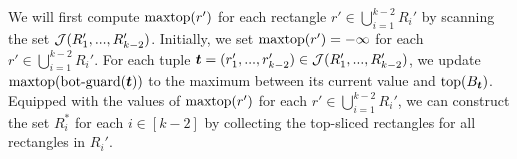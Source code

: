 We will first compute $\mathrm{maxtop}(r')$ for each rectangle $r' \in \bigcup_{i = 1}^{k-2}R_{i}'$ by scanning the set $\mathcal{J}(R_1',...,R_{k-2}')$. Initially, we set $\mathrm{maxtop}(r') = -\infty$ for each $r' \in \bigcup_{i = 1}^{k-2}R_{i}'$. For each tuple $\textrm{\boldmath${t}$} = (r_1',...,r_{k-2}') \in \mathcal{J}(R_1',...,R_{k-2}')$, we update $\mathrm{maxtop}(\mathrm{bot\text{-}guard}(\textrm{\boldmath${t}$}))$ to the maximum between its current value and $\mathrm{top}(B_{\textrm{\boldmath${t}$}})$. Equipped with the values of $\mathrm{maxtop}(r')$ for each $r' \in \bigcup_{i = 1}^{k-2}R_{i}'$, we can construct the set $R_i^*$ for each $i \in [k-2]$ by collecting the top-sliced rectangles for all rectangles in $R_i'$.